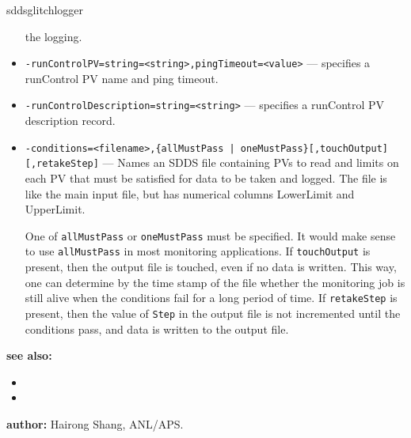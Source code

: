\begin{sddsprog}{sddsglitchlogger}
\begin{itemize}
                the logging.
  \item {\tt -runControlPV=string=<string>,pingTimeout=<value>} --- specifies a runControl PV name
                and ping timeout.
  \item {\tt -runControlDescription=string=<string>} --- specifies a runControl PV description record.
  \item {\verb+-conditions=<filename>,{allMustPass | oneMustPass}[,touchOutput][,retakeStep]+} ---
                   Names an SDDS file containing PVs to read and limits on each PV that must
                   be satisfied for data to be taken and logged.  The file is like the main
                   input file, but has numerical columns LowerLimit and UpperLimit.

                One of \verb+allMustPass+ or \verb+oneMustPass+ must be specified. It would make sense
                to use \verb+allMustPass+ in most monitoring applications.
                If \verb+touchOutput+ is present, then the output file is touched, even if no data
                is written. This way, one can determine by the time stamp of the file
                whether the monitoring job is still alive
                when the conditions fail for a long period of time. If \verb+retakeStep+ is
                present, then the value of \verb+Step+ in the output file is not
                incremented until the conditions pass, and data is written to the output file.
\end{itemize}

\item \textbf{see also:}
\begin{itemize}
  \item {}
  \item {}
\end{itemize}
\item \textbf{author:} Hairong Shang, ANL/APS.
\end{sddsprog}
